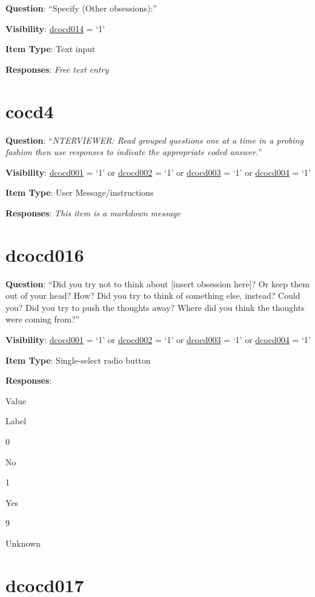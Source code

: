 \documentclass[]{book}
\begin{document}
\textbf{Question}: ``Specify (Other obsessions):''

\textbf{Visibility}: \protect\hyperlink{dcocd014}{dcocd014} = `1'

\textbf{Item Type}: Text input

\textbf{Responses}: \emph{Free text entry}

\hypertarget{cocd4}{%
\section{cocd4}\label{cocd4}}

\textbf{Question}: ``\emph{NTERVIEWER: Read grouped questions one at a time in a probing fashion then use responses to indicate the appropriate coded answer.}''

\textbf{Visibility}: \protect\hyperlink{dcocd001}{dcocd001} = `1' or \protect\hyperlink{dcocd002}{dcocd002} = `1' or \protect\hyperlink{dcocd003}{dcocd003} = `1' or \protect\hyperlink{dcocd004}{dcocd004} = `1'

\textbf{Item Type}: User Message/instructions

\textbf{Responses}: \emph{This item is a markdown message}

\hypertarget{dcocd016}{%
\section{dcocd016}\label{dcocd016}}

\textbf{Question}: ``Did you try not to think about {[}insert obsession here{]}? Or keep them out of your head? How? Did you try to think of something else, instead? Could you? Did you try to push the thoughts away? Where did you think the thoughts were coming from?''

\textbf{Visibility}: \protect\hyperlink{dcocd001}{dcocd001} = `1' or \protect\hyperlink{dcocd002}{dcocd002} = `1' or \protect\hyperlink{dcocd003}{dcocd003} = `1' or \protect\hyperlink{dcocd004}{dcocd004} = `1'

\textbf{Item Type}: Single-select radio button

\textbf{Responses}:

Value

Label

0

No

1

Yes

9

Unknown

\hypertarget{dcocd017}{%
\section{dcocd017}\label{dcocd017}}
\end{document}
